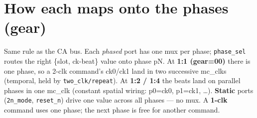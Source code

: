 \documentclass[9pt]{extarticle}
\begin{document}
\section{How each maps onto the phases (gear)}
{\footnotesize Same rule as the CA bus. Each \emph{phased} port has one mux per phase; \texttt{phase\_sel}
routes the right \{slot, ck-beat\} value onto phase pN. At \textbf{1:1 (gear=00)} there is one phase, so
a 2-clk command's ck0/ck1 land in two successive mc\_clks (temporal, held by \texttt{two\_clk/repeat}). At
\textbf{1:2 / 1:4} the beats land on parallel phases in one mc\_clk (constant spatial wiring:
p0=ck0, p1=ck1, \dots). \textbf{Static} ports (\texttt{2n\_mode}, \texttt{reset\_n}) drive one value across
all phases --- no mux. A \textbf{1-clk} command uses one phase; the next phase is free for another command.}
\end{document}
